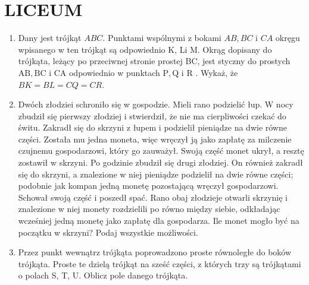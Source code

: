 \documentclass[10pt]{article}
\begin{document}
\section*{LICEUM}
\begin{enumerate}
  \item Dany jest trójkąt \(A B C\). Punktami wspólnymi z bokami \(A B, B C\) i \(C A\) okręgu wpisanego w ten trójkąt są odpowiednio K, Li M. Okrąg dopisany do trójkąta, leżący po przeciwnej stronie prostej BC, jest styczny do prostych \(\mathrm{AB}, \mathrm{BC}\) i CA odpowiednio w punktach \(\mathrm{P}, \mathrm{Q}\) i R . Wykaż, że \(B K=B L=C Q=C R\).
  \item Dwóch złodziei schroniło się w gospodzie. Mieli rano podzielić łup. W nocy zbudził się pierwszy złodziej i stwierdził, że nie ma cierpliwości czekać do świtu. Zakradł się do skrzyni z łupem i podzielił pieniądze na dwie równe części. Została mu jedna moneta, więc wręczył ją jako zapłatę za milczenie czujnemu gospodarzowi, który go zauważył. Swoją część monet ukrył, a resztę zostawił w skrzyni. Po godzinie zbudził się drugi złodziej. On również zakradł się do skrzyni, a znalezione w niej pieniądze podzielił na dwie równe części; podobnie jak kompan jedną monetę pozostającą wręczył gospodarzowi. Schował swoją część i poszedł spać. Rano obaj złodzieje otwarli skrzynię i znalezione w niej monety rozdzielili po równo między siebie, odkładając wcześniej jedną monetę jako zapłatę dla gospodarza. Ile monet mogło być na początku w skrzyni? Podaj wszystkie możliwości.
  \item Przez punkt wewnątrz trójkąta poprowadzono proste równoległe do boków trójkąta. Proste te dzielą trójkąt na sześć części, z których trzy są trójkątami o polach S, T, U. Oblicz pole danego trójkąta.
\end{enumerate}
\end{document}
